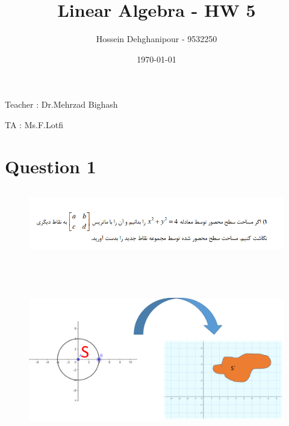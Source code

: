 \documentclass[a4paper,12pt]{article}
\begin{document}
    \begin{titlepage}
        \begin{center}
            \title{\Large{\textbf{Linear Algebra - HW 5}}}
            \author{Hossein Dehghanipour - 9532250}
            \date{\today}
        \end{center}
    \end{titlepage}

    \maketitle
\begin{doublespace}
\begin{flushleft}
\begin{doublespace}
	Teacher :  Dr.Mehrzad Bighash
\end{doublespace} 
\begin{doublespace}
	TA : Ms.F.Lotfi
\end{doublespace} 
\end{flushleft}
\end{doublespace} 

\newpage
\setmainfont{Times New Roman}
\tableofcontents
\thispagestyle{empty}
\newpage
{}


\fontsize{15pt}{15pt}
\newcommand{\nnl}{\newline \noindent}
\newcommand{\ptx}{ P_{tx} }
\newcommand{\prx}{ P_{rx} }
\section {Question 1}

\begin{figure}[h!]
	\centering
	\includegraphics*[height=3cm]{Q1}
\end{figure}

\begin{figure}[h!]
	\centering
	\includegraphics*[height=8cm]{Pic1}
\end{figure}
\end{document}
